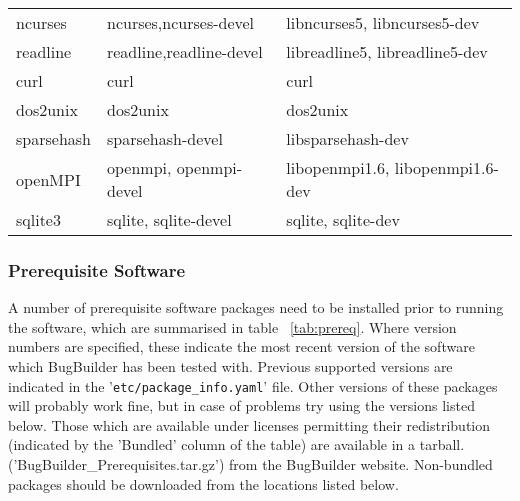 \documentclass[a4paper,10pt]{article}
\begin{document}
\begin{table}[htb]
{\begin{tabular}{lll}
ncurses                & ncurses,ncurses-devel                   & libncurses5, libncurses5-dev \\
readline               & readline,readline-devel                 & libreadline5, libreadline5-dev \\
curl                   & curl                                    & curl \\
dos2unix               & dos2unix                                & dos2unix \\
sparsehash             & sparsehash-devel                        & libsparsehash-dev\\
openMPI                & openmpi, openmpi-devel                  & libopenmpi1.6, libopenmpi1.6-dev\\
sqlite3                & sqlite, sqlite-devel                    & sqlite, sqlite-dev\\
\hline
\end{tabular}}
\label{tab:ospackages}
\end{table}

\subsubsection{Prerequisite Software}

A number of prerequisite software packages need to be installed prior to
running the software, which are summarised in table ~\ref{tab:prereq}. Where
version numbers are specified, these indicate the most recent version of the
software which  BugBuilder has been tested with. Previous supported versions
are indicated in the '{\tt etc/package\_info.yaml}' file. Other versions of
these packages will probably work fine, but in case of problems try using the
versions listed below. Those which are available under licenses permitting
their redistribution (indicated by the 'Bundled' column of the table) are
available in a tarball.  ('BugBuilder\_Prerequisites.tar.gz') from the
BugBuilder website.  Non-bundled packages should be downloaded from the
locations listed below.
\end{document}
